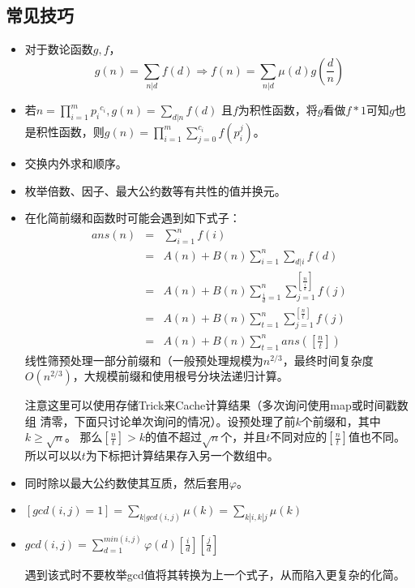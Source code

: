 \subsection{常见技巧}
\begin{itemize}
	\item
	      对于数论函数$g,f$，
	      \begin{displaymath}
		      g(n)=\sum_{n|d}{f(d)}\Rightarrow
		      f(n)=\sum_{n|d}{\mu(d)g(\frac{d}{n})}
	      \end{displaymath}
	\item
	      若$\displaystyle n=\prod_{i=1}^m{{p_i}^{c_i}},g(n)=\sum_{d|n}{f(d)}$
	      且$f$为积性函数，将$g$看做$f*1$可知$g$也是积性函数，则$\displaystyle
		      g(n)=\prod_{i=1}^m{\sum_{j=0}^{c_i}{f(p_i^j)}}$。
	\item 交换内外求和顺序。
	\item 枚举倍数、因子、最大公约数等有共性的值并换元。
	\item 在化简前缀和函数时可能会遇到如下式子：
	      \begin{eqnarray*}
		      ans(n)&=&\sum_{i=1}^n{f(i)}\\
		      &=&A(n)+B(n)\sum_{i=1}^n{\sum_{d|i}{f(d)}}\\
		      &=&A(n)+B(n)\sum_{\frac{i}{d}=1}^n{\sum_{j=1}^{\left[\frac{n}{\frac{i}{d}}\right]}{f(j)}}\\
		      &=&A(n)+B(n)\sum_{t=1}^n{\sum_{j=1}^{[\frac{n}{t}]}{f(j)}}\\
		      &=&A(n)+B(n)\sum_{t=1}^n{ans([\frac{n}{t}])}
	      \end{eqnarray*}
	      线性筛预处理一部分前缀和（一般预处理规模为$n^{2/3}$，最终时间复杂度
	      $O(n^{2/3})$，大规模前缀和使用根号分块法递归计算。

	      注意这里可以使用存储Trick来Cache计算结果（多次询问使用map或时间戳数组
	      清零，下面只讨论单次询问的情况）。设预处理了前$k$个前缀和，其中$k\geq \sqrt{n}$。
		那么$[\frac{n}{t}]>k$的值不超过$\sqrt{n}$个，并且$t$不同对应的$[\frac{n}{t}]$值也不同。
		所以可以以$t$为下标把计算结果存入另一个数组中。
	\item 同时除以最大公约数使其互质，然后套用$\varphi$。
	\item $\displaystyle [gcd(i,j)=1]=\sum_{k|gcd(i,j)}\mu(k)=\sum_{k|i,k|j}\mu(k)$
	\item $\displaystyle gcd(i,j)=\sum_{d=1}^{min(i,j)}{\varphi(d)[\frac{i}{d}][\frac{j}{d}]}$
		
		遇到该式时不要枚举gcd值将其转换为上一个式子，从而陷入更复杂的化简。
	

\end{itemize}
